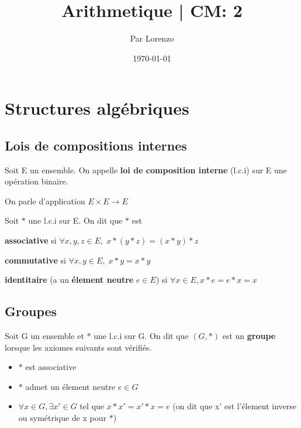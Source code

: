 \documentclass[a4paper, 12pt]{article}
\title{Arithmetique | CM: 2}
\author{Par Lorenzo}
\date{\today}
\begin{document}
\maketitle

\section{Structures algébriques}

\subsection{Lois de compositions internes}

\begin{definition}
    Soit E un ensemble. On appelle \textbf{loi de composition interne} (l.c.i) sur E une opération binaire.

    On parle d'application $E \times E \rightarrow E$
\end{definition}

\begin{definition}
    Soit $*$ une l.c.i sur E. On dit que $*$ est

    \item \textbf{associative} si $\forall x, y, z \in E, \; x * (y * z) = (x * y) * z$
    \item \textbf{commutative} si $\forall x, y \in E, \; x * y = x * y$
    \item \textbf{identitaire} (a un \textbf{élement neutre} $e \in E$) si $\forall x \in E, x * e = e * x = x$ 
\end{definition}

\subsection{Groupes}

\begin{definition}
    Soit G un ensemble et $*$ une l.c.i sur G. On dit que $(G, *)$ est un \textbf{groupe} lorsque les axiomes suivants sont vérifiés.

    \begin{itemize}
        \item $*$ est associative
        \item $*$ admet un élement neutre $e \in G$
        \item $\forall x \in G, \exists x' \in G$ tel que $x * x' = x' * x = e$ (on dit que x' est l'élement inverse ou symétrique de x pour $*$)
    \end{itemize}
\end{definition}
\end{document}
